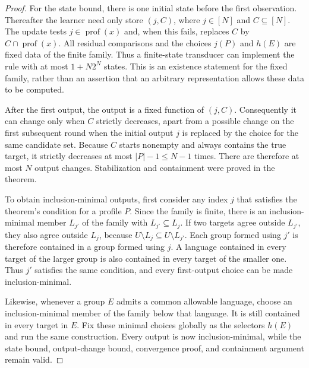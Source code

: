 \begin{proof}
For the state bound, there is one initial state before the first
observation. Thereafter the learner need only store $(j,C)$, where
$j\in[N]$ and $C\subseteq[N]$. The update tests $j\in
\operatorname{prof}(x)$ and, when this fails, replaces $C$ by
$C\cap\operatorname{prof}(x)$. All residual comparisons and the
choices $j(P)$ and $h(E)$ are fixed data of the finite family.
Thus a finite-state transducer can implement the rule with at most
$1+N2^N$ states. This is an existence statement for the fixed
family, rather than an assertion that an arbitrary representation
allows these data to be computed.

After the first output, the output is a fixed function of $(j,C)$.
Consequently it can change only when $C$ strictly decreases,
apart from a possible change on the first subsequent round when
the initial output $j$ is replaced by the choice for the same
candidate set. Because $C$ starts nonempty and always contains the
true target, it strictly decreases at most $|P|-1\le N-1$ times.
There are therefore at most $N$ output changes. Stabilization and
containment were proved in the theorem.

To obtain inclusion-minimal outputs, first consider any index $j$
that satisfies the theorem's condition for a profile $P$. Since
the family is finite, there is an inclusion-minimal member $L_{j'}$
of the family with $L_{j'}\subseteq L_j$. If two targets agree
outside $L_{j'}$, they also agree outside $L_j$, because
$U\setminus L_j\subseteq U\setminus L_{j'}$. Each group formed
using $j'$ is therefore contained in a group formed using $j$.
A language contained in every target of the larger group is also
contained in every target of the smaller one. Thus $j'$ satisfies
the same condition, and every first-output choice can be made
inclusion-minimal.

Likewise, whenever a group $E$ admits a common allowable language,
choose an inclusion-minimal member of the family below that
language. It is still contained in every target in $E$. Fix these
minimal choices globally as the selectors $h(E)$ and run the same
construction. Every output is now inclusion-minimal, while the
state bound, output-change bound, convergence proof, and containment
argument remain valid.
\end{proof}
